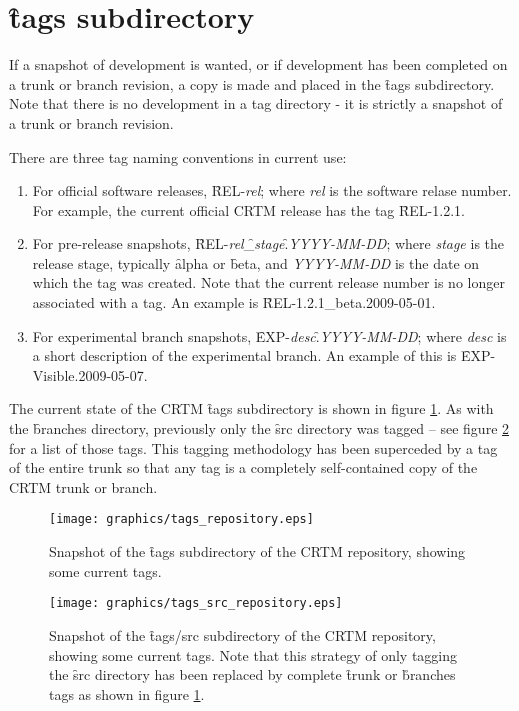 \section{\f{tags} subdirectory}
If a snapshot of development is wanted, or if development has been completed on a trunk or branch revision, a copy is made and placed in the \f{tags} subdirectory. Note that there is no development in a tag directory - it is strictly a snapshot of a trunk or branch revision.

There are three tag naming conventions in current use:
\begin{enumerate}
  \item For official software releases, \f{REL-}\textit{rel}; where \textit{rel} is the software relase number. For example, the current official CRTM release has the tag \f{REL-1.2.1}.
  \item For pre-release snapshots, \f{REL-}\textit{rel}\f{\_}\textit{stage}\f{.}\textit{YYYY-MM-DD}; where \textit{stage} is the release stage, typically \f{alpha} or \f{beta}, and \textit{YYYY-MM-DD} is the date on which the tag was created. Note that the current release number is no longer associated with a tag. An example is \f{REL-1.2.1\_beta.2009-05-01}. 
  \item For experimental branch snapshots, \f{EXP-}\textit{desc}\f{.}\textit{YYYY-MM-DD}; where \textit{desc} is a short description of the experimental branch. An example of this is \f{EXP-Visible.2009-05-07}.
\end{enumerate}

The current state of the CRTM \f{tags} subdirectory is shown in figure \ref{fig:tags_repository}. As with the \f{branches} directory, previously only the \f{src} directory was tagged -- see figure \ref{fig:tags_src_repository} for a list of those tags. This tagging methodology has been superceded by a tag of the entire trunk so that any tag is a completely self-contained copy of the CRTM trunk or branch.

\begin{figure}[htb]
  \centering
  \texttt{[image: graphics/tags\_repository.eps]}
  \caption{Snapshot of the \f{tags} subdirectory of the CRTM repository, showing some current tags.}
  \label{fig:tags_repository}
\end{figure}

\begin{figure}[htb]
  \centering
  \texttt{[image: graphics/tags\_src\_repository.eps]}
  \caption{Snapshot of the \f{tags/src} subdirectory of the CRTM repository, showing some current tags. Note that this strategy of only tagging the \f{src} directory has been replaced by complete \f{trunk} or \r{branches} tags as shown in figure \ref{fig:tags_repository}.}
  \label{fig:tags_src_repository}
\end{figure}
